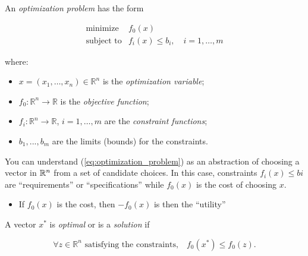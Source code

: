 


\begin{Definition}
An \textit{optimization problem} has the form

\begin{equation}\label{eq:optimization_problem}
	\begin{array}{rl}
	\text{minimize} & f_0(x) \\
	\text{subject to} & f_i(x)\le b_i,\quad i=1,\ldots,m
	\end{array}
\end{equation}

where:

\begin{itemize}
	\item $x=(x_1,\ldots,x_n)\in\mathbb R^n$ is the \textit{optimization variable};
	\item $f_0:\mathbb R^n\to\mathbb R$ is the \textit{objective function};
	\item $f_i:\mathbb R^n\to \mathbb R$, $i=1,\ldots,m$ are the \textit{constraint functions};
	\item $b_1,...,b_m$ are the limits (bounds) for the constraints.
\end{itemize}

\end{Definition}

\begin{Fact}
You can understand (\ref{eq:optimization_problem}) as an abstraction of choosing a vector in $\mathbb R^n$ from a set of candidate choices. In this case, constraints $f_i(x)\le bi$ are ``requirements'' or ``specifications'' while $f_0(x)$ is the cost of choosing $x$.

\begin{itemize}
\item If $f_0(x)$ is the cost, then $-f_0(x)$ is then the ``utility''
\end{itemize}
\end{Fact}

\begin{Definition}
A vector $x^*$ is \textit{optimal} or is a \textit{solution} if

\begin{equation*}
	\forall z\in\mathbb R^n\text{ satisfying the constraints,}\quad f_0(x^*)\le f_0(z).
\end{equation*}
\end{Definition}

